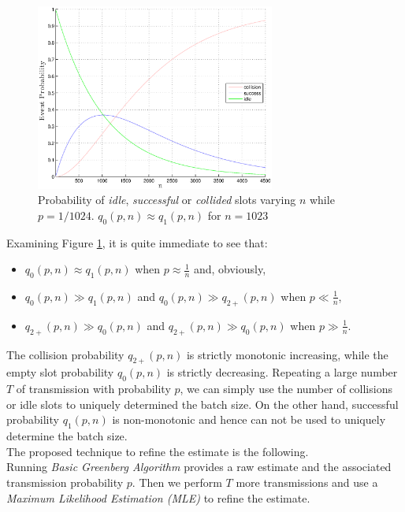 \documentclass[11pt,a4paper,twoside,openright]{book}
\begin{document}
\begin{figure}[htbp]
\begin{center}
\includegraphics[width=0.7\textwidth]{matlab/Greenberg_MLE/draw_coll_idle_succ_fixed_p}
\caption[\emph{Basic Greenberg}: Event probability fixed $p$]{Probability of \emph{idle}, \emph{successful} or \emph{collided} slots varying $n$ while  $p=1/1024$.  $q_{0}(p,n) \approx  q_{1}(p,n)$ for $n=1023$}
\label{fg:event-prob-fixed-p-varying-n}
\end{center}
\end{figure}

Examining Figure \ref{fg:event-prob-fixed-p-varying-n}, it is quite immediate to see that:
\begin{itemize}
\item $q_{0}(p,n) \approx q_{1}(p,n)$ when $p\approx {\displaystyle\frac{1}{n}}$ and, obviously,
\item $q_{0}(p,n) \gg q_{1}(p,n)$ and $q_{0}(p,n) \gg q_{2+}(p,n)$ when $p \ll {\displaystyle\frac{1}{n}}$,
\item $q_{2+}(p,n) \gg q_{0}(p,n)$ and $q_{2+}(p,n) \gg q_{0}(p,n)$ when $p \gg {\displaystyle\frac{1}{n}}$.
\end{itemize}
The collision probability $q_{2+}(p,n)$ is strictly monotonic  increasing, while the empty slot probability $q_{0}(p,n)$ is strictly decreasing. Repeating a large number $T$ of transmission with  probability $p$, we can simply use the number of collisions or idle slots to uniquely determined the batch size. On the other hand, successful probability $q_{1}(p,n)$ is non-monotonic and hence can not be used to uniquely determine the batch size.\\
 
\noindent The proposed technique to refine the estimate is the following.\\
Running \emph{Basic Greenberg Algorithm} provides a raw estimate and the associated transmission probability $p$. Then we perform $T$ more transmissions and use a \emph{Maximum Likelihood Estimation (MLE)} to refine the estimate.\\ 
 
\end{document}
